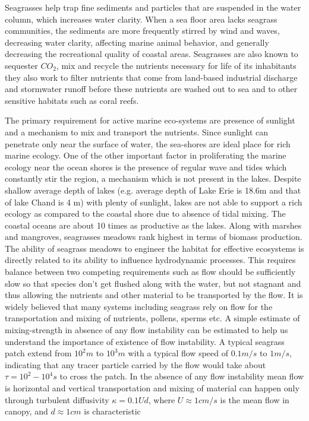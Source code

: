 \documentclass[12pt]{report}   %
\begin{document}
Seagrasses help trap fine sediments and particles that are suspended in the water column, which increases water clarity. When a sea floor area lacks seagrass communities, the sediments are more frequently stirred by wind and waves, decreasing water clarity, affecting marine animal behavior, and generally decreasing the recreational quality of coastal areas. Seagrasses are also known to sequester $C O_2$, mix and recycle the nutrients necessary for life of its inhabitants they also work to filter nutrients that come from land-based industrial discharge and stormwater runoff before these nutrients are washed out to sea and to other sensitive habitats such as coral reefs.

The primary requirement for active marine eco-systems are presence of sunlight and a mechanism to mix and transport the nutrients. Since sunlight can penetrate only near the surface of water, the sea-shores are ideal place for rich marine ecology. One of the other important factor in proliferating the marine ecology near the ocean shores is the presence of regular wave and tides which constantly stir the region, a mechanism which is not present in the lakes. Despite shallow average depth of lakes (e.g. average depth of Lake Erie is 18.6m and that of lake Chand is 4 m) with plenty of sunlight, lakes are not able to support a rich ecology as compared to the coastal shore due to absence of tidal mixing. The coastal oceans are about 10 times as productive as the lakes. Along with marshes and mangroves, seagrasses meadows rank highest in terms of biomass production.
\newline
The ability of seagrass meadows to engineer the habitat for effective ecosystems is directly related to its ability to influence hydrodynamic processes. This requires balance between
two competing requirements such as flow should be sufficiently slow so that species don't get flushed along with the water, but not stagnant and thus allowing the nutrients and other material to be transported by the flow. It is widely believed that many systems including seagrass rely on flow for the transportation and mixing of nutrients, pollens, sperms etc. A simple estimate of mixing-strength in absence of any flow instability can be estimated to help us understand the importance of existence of flow instability. A typical seagrass patch extend from $10^2 m$ to $10^3 m$ with a typical flow speed of $0.1 m/s$ to $1 m/s$, indicating that any tracer particle carried by the flow would take about $\tau = 10^2-10^4 s$ to cross the patch. In the absence of any flow instability mean flow is horizontal and vertical transportation and mixing of material can happen only through turbulent diffusivity $\kappa =  0.1 U d$, where $ U \approx 1 cm/s$ is the mean flow in canopy, and $d \approx 1cm $ is characteristic 
\end{document}
